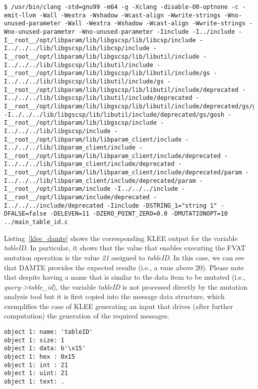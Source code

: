 \begin{lstlisting}[style=CStyle]
$ /usr/bin/clang -std=gnu99 -m64 -g -Xclang -disable-O0-optnone -c -emit-llvm -Wall -Wextra -Wshadow -Wcast-align -Wwrite-strings -Wno-unused-parameter -Wall -Wextra -Wshadow -Wcast-align -Wwrite-strings -Wno-unused-parameter -Wno-unused-parameter -Iinclude -I../include -I__root__/opt/libparam/lib/libgscsp/lib/libcsp/include -I../../../lib/libgscsp/lib/libcsp/include -I__root__/opt/libparam/lib/libgscsp/lib/libutil/include -I../../../lib/libgscsp/lib/libutil/include -I__root__/opt/libparam/lib/libgscsp/lib/libutil/include/gs -I../../../lib/libgscsp/lib/libutil/include/gs -I__root__/opt/libparam/lib/libgscsp/lib/libutil/include/deprecated -I../../../lib/libgscsp/lib/libutil/include/deprecated -I__root__/opt/libparam/lib/libgscsp/lib/libutil/include/deprecated/gs/gosh -I../../../lib/libgscsp/lib/libutil/include/deprecated/gs/gosh -I__root__/opt/libparam/lib/libgscsp/include -I../../../lib/libgscsp/include -I__root__/opt/libparam/lib/libparam_client/include -I../../../lib/libparam_client/include -I__root__/opt/libparam/lib/libparam_client/include/deprecated -I../../../lib/libparam_client/include/deprecated -I__root__/opt/libparam/lib/libparam_client/include/deprecated/param -I../../../lib/libparam_client/include/deprecated/param -I__root__/opt/libparam/include -I../../../include -I__root__/opt/libparam/include/deprecated -I../../../include/deprecated -Iinclude -DSTRING_1="string 1" -DFALSE=false -DELEVEN=11 -DZERO_POINT_ZERO=0.0 -DMUTATIONOPT=10 ../main_table_id.c
\end{lstlisting}

Listing~\ref{klee_damte} shows the corresponding KLEE output for the variable \emph{tableID}. In particular, it shows that the  value that enables executing the FVAT mutation operation is the value \emph{21} assigned to \emph{tableID}. In this case, we can see that DAMTE provides the expected results (i.e., a vaue above 20). Please note that despite having a name that is similar to the data item to be mutated (i.e., \emph{query->table\_id}), the variable \emph{tableID} is not processed directly by the mutation analysis tool but it is first copied into the message data structure, which exemplifies the case of KLEE generating an input that drives (after further computation) the generation of the required messages.

\begin{lstlisting}[style=CStyle,float=t, caption=KLEE output for the variable tableID., label=klee_damte]
object 1: name: 'tableID'
object 1: size: 1
object 1: data: b'\x15'
object 1: hex : 0x15
object 1: int : 21
object 1: uint: 21
object 1: text: .
\end{lstlisting}

